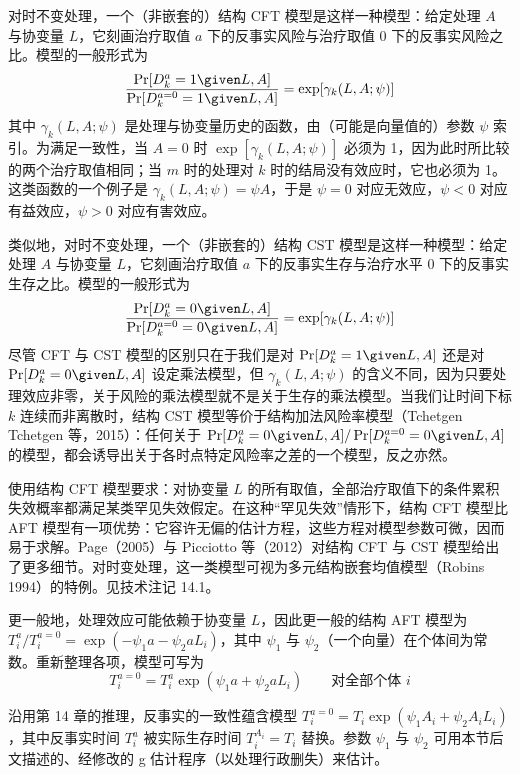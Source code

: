 \begin{techpoint}
对时不变处理，一个（非嵌套的）结构 CFT 模型是这样一种模型：给定处理 $A$ 与协变量 $L$，它刻画治疗取值 $a$ 下的反事实风险与治疗取值 0 下的反事实风险之比。模型的一般形式为
\[
\frac{\Pr[D_k^a=1\given L,A]}{\Pr[D_k^{a=0}=1\given L,A]}=\exp[\gamma_k(L,A;\psi)]
\]
其中 $\gamma_k(L,A;\psi)$ 是处理与协变量历史的函数，由（可能是向量值的）参数 $\psi$ 索引。为满足一致性，当 $A=0$ 时 $\exp[\gamma_k(L,A;\psi)]$ 必须为 1，因为此时所比较的两个治疗取值相同；当 $m$ 时的处理对 $k$ 时的结局没有效应时，它也必须为 1。这类函数的一个例子是 $\gamma_k(L,A;\psi)=\psi A$，于是 $\psi=0$ 对应无效应，$\psi<0$ 对应有益效应，$\psi>0$ 对应有害效应。

类似地，对时不变处理，一个（非嵌套的）结构 CST 模型是这样一种模型：给定处理 $A$ 与协变量 $L$，它刻画治疗取值 $a$ 下的反事实生存与治疗水平 0 下的反事实生存之比。模型的一般形式为
\[
\frac{\Pr[D_k^a=0\given L,A]}{\Pr[D_k^{a=0}=0\given L,A]}=\exp[\gamma_k(L,A;\psi)]
\]
尽管 CFT 与 CST 模型的区别只在于我们是对 $\Pr[D_k^a=1\given L,A]$ 还是对 $\Pr[D_k^a=0\given L,A]$ 设定乘法模型，但 $\gamma_k(L,A;\psi)$ 的含义不同，因为只要处理效应非零，关于风险的乘法模型就不是关于生存的乘法模型。当我们让时间下标 $k$ 连续而非离散时，结构 CST 模型等价于结构加法风险率模型（Tchetgen Tchetgen 等，2015）：任何关于 $\Pr[D_k^a=0\given L,A]/\Pr[D_k^{a=0}=0\given L,A]$ 的模型，都会诱导出关于各时点特定风险率之差的一个模型，反之亦然。

使用结构 CFT 模型要求：对协变量 $L$ 的所有取值，全部治疗取值下的条件累积失效概率都满足某类罕见失效假定。在这种“罕见失效”情形下，结构 CFT 模型比 AFT 模型有一项优势：它容许无偏的估计方程，这些方程对模型参数可微，因而易于求解。Page（2005）与 Picciotto 等（2012）对结构 CFT 与 CST 模型给出了更多细节。对时变处理，这一类模型可视为多元结构嵌套均值模型（Robins 1994）的特例。见技术注记 14.1。
\end{techpoint}

更一般地，处理效应可能依赖于协变量 $L$，因此更一般的结构 AFT 模型为 $T_i^a/T_i^{a=0}=\exp(-\psi_1a-\psi_2aL_i)$，其中 $\psi_1$ 与 $\psi_2$（一个向量）在个体间为常数。重新整理各项，模型可写为
\[
T_i^{a=0}=T_i^a\exp(\psi_1a+\psi_2aL_i)\qquad\text{对全部个体 }i
\]

沿用第 14 章的推理，反事实的一致性蕴含模型 $T_i^{a=0}=T_i\exp(\psi_1A_i+\psi_2A_iL_i)$，其中反事实时间 $T_i^a$ 被实际生存时间 $T_i^{A_i}=T_i$ 替换。参数 $\psi_1$ 与 $\psi_2$ 可用本节后文描述的、经修改的 g 估计程序（以处理行政删失）来估计。

